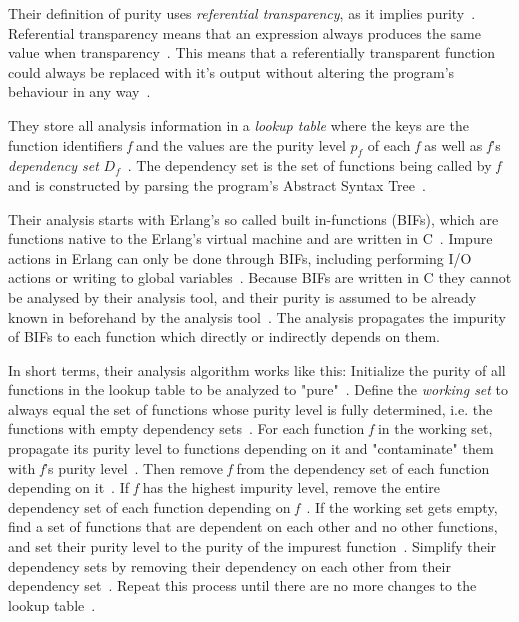 \documentclass[a4paper,12pt]{article}
\begin{document}
Their definition of purity uses \textit{referential transparency}, as it implies purity~\cite{pitidis2010purity}. Referential transparency means that an expression always produces the same value when transparency~\cite{pitidis2010purity}. This means that a referentially transparent function could always be replaced with it's output without altering the program's behaviour in any way~\cite{pitidis2010purity}.

They store all analysis information in a \textit{lookup table} where the keys are the function identifiers \textit{f} and the values are the purity level \textit{$p_f$} of each \textit{f} as well as \textit{f}'s \textit{dependency set} $D_f$~\cite{pitidis2010purity}. The dependency set is the set of functions being called by \textit{f} and is constructed by parsing the program's Abstract Syntax Tree~\cite{pitidis2010purity}.

Their analysis starts with Erlang's so called built in-functions (BIFs), which are functions native to the Erlang's virtual machine and are written in C~\cite{pitidis2010purity}. Impure actions in Erlang can only be done through BIFs, including performing I/O actions or writing to global variables~\cite{kostis-email}. Because BIFs are written in C they cannot be analysed by their analysis tool, and their purity is assumed to be already known in beforehand by the analysis tool~\cite{pitidis2010purity}. The analysis propagates the impurity of BIFs to each function which directly or indirectly depends on them.

In short terms, their analysis algorithm works like this: Initialize the purity of all functions in the lookup table to be analyzed to "pure"~\cite{pitidis2010purity}. Define the \textit{working set} to always equal the set of functions whose purity level is fully determined, i.e. the functions with empty dependency sets~\cite{pitidis2010purity}. For each function \textit{f} in the working set, propagate its purity level to functions depending on it and "contaminate" them with \textit{f}'s purity level~\cite{pitidis2010purity}. Then remove \textit{f} from the  dependency set of each function depending on it~\cite{pitidis2010purity}. If \textit{f} has the highest impurity level, remove the entire dependency set of each function depending on \textit{f}~\cite{pitidis2010purity}. If the working set gets empty, find a set of functions that are dependent on each other and no other functions, and set their purity level to the purity of the impurest function~\cite{pitidis2010purity}. Simplify their dependency sets by removing their dependency on each other from their dependency set~\cite{pitidis2010purity}. Repeat this process until there are no more changes to the lookup table~\cite{pitidis2010purity}.
\end{document}
